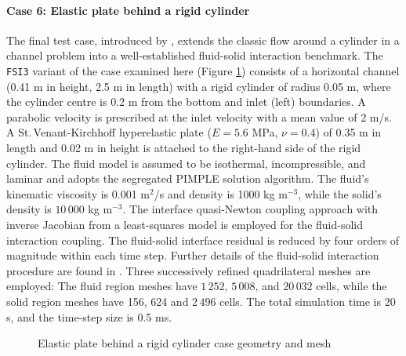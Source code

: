 \documentclass[sn-mathphys,Numbered]{sn-jnl}%
\begin{document}
\paragraph{Case 6: Elastic plate behind a rigid cylinder}
The final test case, introduced by \citet{Turek2006}, extends the classic flow around a cylinder in a channel problem \citep{Ferziger2002} into a well-established fluid-solid interaction benchmark.
The \texttt{FSI3} variant of the case examined here (Figure \ref{fig:hronTurek-mesh}) consists of a horizontal channel (0.41 m in height, 2.5 m in length) with a rigid cylinder of radius 0.05 m, where the cylinder centre is 0.2 m from the bottom and inlet (left) boundaries.
A parabolic velocity is prescribed at the inlet velocity with a mean value of 2 m/s.
A St.\,Venant-Kirchhoff hyperelastic plate ($E = 5.6$ MPa, $\nu = 0.4$) of 0.35 m in length and 0.02 m in height is attached to the right-hand side of the rigid cylinder.
The fluid model is assumed to be isothermal, incompressible, and laminar and adopts the segregated PIMPLE solution algorithm.
The fluid's kinematic viscosity is 0.001 m$^2$/s and density is 1000 kg m$^{-3}$, while the solid's density is $10\,000$ kg m$^{-3}$.
The interface quasi-Newton coupling approach with inverse Jacobian from a least-squares model \cite{Degroote2009} is employed for the fluid-solid interaction coupling.
The fluid-solid interface residual is reduced by four orders of magnitude within each time step.
Further details of the fluid-solid interaction procedure are found in \citet{Tukovic2018}.
Three successively refined quadrilateral meshes are employed:
The fluid region meshes have $1\,252$, $5\,008$, and $20\,032$ cells, while the solid region meshes have 156,  624 and $2\,496$ cells.
The total simulation time is 20 s, and the time-step size is 0.5 ms. 
\begin{figure}[htbp]
   \centering
   \caption{Elastic plate behind a rigid cylinder case geometry and mesh}
   \label{fig:hronTurek-mesh}
\end{figure}
\end{document}
